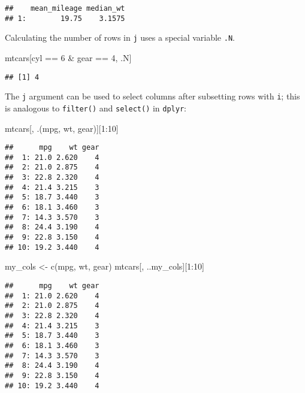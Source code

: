 \documentclass[
]{book}
\newenvironment{Shaded}{\begin{snugshade}}{\end{snugshade}}
\newcommand{\DecValTok}[1]{\textcolor[rgb]{0.00,0.00,0.81}{#1}}
\newcommand{\FunctionTok}[1]{\textcolor[rgb]{0.00,0.00,0.00}{#1}}
\newcommand{\NormalTok}[1]{#1}
\newcommand{\OtherTok}[1]{\textcolor[rgb]{0.56,0.35,0.01}{#1}}
\newcommand{\SpecialCharTok}[1]{\textcolor[rgb]{0.00,0.00,0.00}{#1}}
\newcommand{\StringTok}[1]{\textcolor[rgb]{0.31,0.60,0.02}{#1}}
\begin{document}
\begin{verbatim}
##    mean_mileage median_wt
## 1:        19.75    3.1575
\end{verbatim}

Calculating the number of rows in \texttt{j} uses a special variable \texttt{.N}.

\begin{Shaded}
\begin{Highlighting}[]
\NormalTok{mtcars[cyl }\SpecialCharTok{==} \DecValTok{6} \SpecialCharTok{\&}\NormalTok{ gear }\SpecialCharTok{==} \DecValTok{4}\NormalTok{, .N]}
\end{Highlighting}
\end{Shaded}

\begin{verbatim}
## [1] 4
\end{verbatim}

The \texttt{j} argument can be used to select columns after subsetting rows with \texttt{i}; this is analogous to \texttt{filter()} and \texttt{select()} in \texttt{dplyr}:

\begin{Shaded}
\begin{Highlighting}[]
\NormalTok{mtcars[, .(mpg, wt, gear)][}\DecValTok{1}\SpecialCharTok{:}\DecValTok{10}\NormalTok{]}
\end{Highlighting}
\end{Shaded}

\begin{verbatim}
##      mpg    wt gear
##  1: 21.0 2.620    4
##  2: 21.0 2.875    4
##  3: 22.8 2.320    4
##  4: 21.4 3.215    3
##  5: 18.7 3.440    3
##  6: 18.1 3.460    3
##  7: 14.3 3.570    3
##  8: 24.4 3.190    4
##  9: 22.8 3.150    4
## 10: 19.2 3.440    4
\end{verbatim}

\begin{Shaded}
\begin{Highlighting}[]
\NormalTok{my\_cols }\OtherTok{\textless{}{-}} \FunctionTok{c}\NormalTok{(}\StringTok{\textquotesingle{}mpg\textquotesingle{}}\NormalTok{, }\StringTok{\textquotesingle{}wt\textquotesingle{}}\NormalTok{, }\StringTok{\textquotesingle{}gear\textquotesingle{}}\NormalTok{)}
\NormalTok{mtcars[, ..my\_cols][}\DecValTok{1}\SpecialCharTok{:}\DecValTok{10}\NormalTok{]}
\end{Highlighting}
\end{Shaded}

\begin{verbatim}
##      mpg    wt gear
##  1: 21.0 2.620    4
##  2: 21.0 2.875    4
##  3: 22.8 2.320    4
##  4: 21.4 3.215    3
##  5: 18.7 3.440    3
##  6: 18.1 3.460    3
##  7: 14.3 3.570    3
##  8: 24.4 3.190    4
##  9: 22.8 3.150    4
## 10: 19.2 3.440    4
\end{verbatim}
\end{document}

